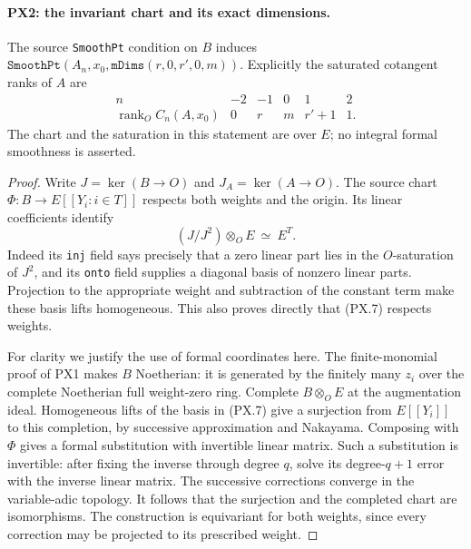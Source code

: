 \paragraph{PX2: the invariant chart and its exact dimensions.}
\label{claim:PX2}
The source \texttt{SmoothPt} condition on $B$ induces
$\texttt{SmoothPt}(A_n,x_0,\mathtt{mDims}(r,0,r',0,m))$.
Explicitly the saturated cotangent ranks of $A$ are
\[
 \begin{array}{c|rrrrr}
 n&-2&-1&0&1&2\\\hline
 \operatorname{rank}_O C_n(A,x_0)&0&r&m&r'+1&1.
 \end{array}
 \tag{PX.6}
\]
The chart and the saturation in this statement are over $E$;
no integral formal smoothness is asserted.

\begin{proof}
Write $J=\ker(B\to O)$ and $J_A=\ker(A\to O)$.  The source
chart $\Phi:B\to E[[Y_i:i\in T]]$ respects both weights
and the origin.  Its linear coefficients identify
\[
 (J/J^2)\otimes_O E\ \simeq\ E^T.
 \tag{PX.7}
\]
Indeed its \texttt{inj} field says precisely that a zero
linear part lies in the $O$-saturation of $J^2$, and its
\texttt{onto} field supplies a diagonal basis of nonzero
linear parts.  Projection to the appropriate weight and
subtraction of the constant term make these basis lifts
homogeneous.  This also proves directly that (PX.7) respects
weights.

For clarity we justify the use of formal coordinates here.
The finite-monomial proof of PX1 makes $B$ Noetherian: it is
generated by the finitely many $z_i$ over the complete
Noetherian full weight-zero ring.  Complete $B\otimes_O E$
at the augmentation ideal.  Homogeneous lifts of the basis
in (PX.7) give a surjection from $E[[Y_i]]$ to this
completion, by successive approximation and Nakayama.
Composing with $\Phi$ gives a formal substitution with
invertible linear matrix.  Such a substitution is invertible:
after fixing the inverse through degree $q$, solve its
degree-$q+1$ error with the inverse linear matrix.  The
successive corrections converge in the variable-adic
topology.  It follows that the surjection and the completed
chart are isomorphisms.  The construction is equivariant
for both weights, since every correction may be projected
to its prescribed weight.


\end{proof}
